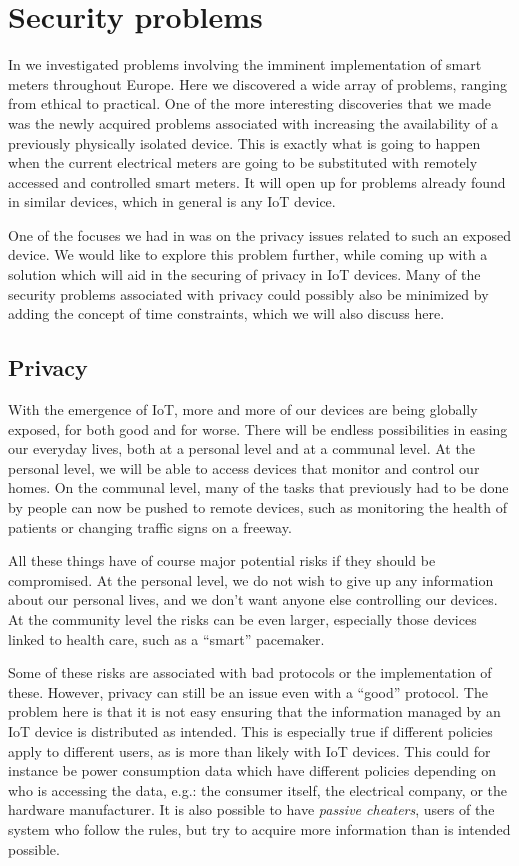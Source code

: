 
\section{Security problems}
In \cite{prespecialization} we investigated problems involving the imminent implementation of smart meters throughout Europe.
Here we discovered a wide array of problems, ranging from ethical to practical.
One of the more interesting discoveries that we made was the newly acquired problems associated with increasing the availability of a previously physically isolated device.
This is exactly what is going to happen when the current electrical meters are going to be substituted with remotely accessed and controlled smart meters.
It will open up for problems already found in similar devices, which in general is any IoT device.

One of the focuses we had in \cite{prespecialization} was on the privacy issues related to such an exposed device.
We would like to explore this problem further, while coming up with a solution which will aid in the securing of privacy in IoT devices.
Many of the security problems associated with privacy could possibly also be minimized by adding the concept of time constraints, which we will also discuss here.

\subsection{Privacy}
With the emergence of IoT, more and more of our devices are being globally exposed, for both good and for worse.
There will be endless possibilities in easing our everyday lives, both at a personal level and at a communal level.
At the personal level, we will be able to access devices that monitor and control our homes.
On the communal level, many of the tasks that previously had to be done by people can now be pushed to remote devices, such as monitoring the health of patients or changing traffic signs on a freeway.

All these things have of course major potential risks if they should be compromised.
At the personal level, we do not wish to give up any information about our personal lives, and we don't want anyone else controlling our devices.
At the community level the risks can be even larger, especially those devices linked to health care, such as a ``smart'' pacemaker.

Some of these risks are associated with bad protocols or the implementation of these.
However, privacy can still be an issue even with a ``good'' protocol.
The problem here is that it is not easy ensuring that the information managed by an IoT device is distributed as intended.
This is especially true if different policies apply to different users, as is more than likely with IoT devices.
This could for instance be power consumption data which have different policies depending on who is accessing the data, e.g.: the consumer itself, the electrical company, or the hardware manufacturer.
It is also possible to have \emph{passive cheaters}, users of the system who follow the rules, but try to acquire more information than is intended possible.

